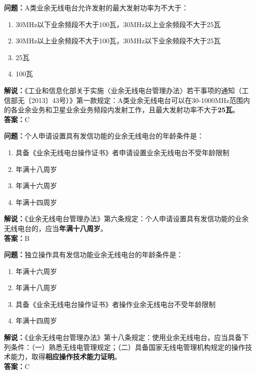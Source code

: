 \documentclass{ctexbook}
\begin{document}
\bigskip


\noindent\textbf{问题：}A类业余无线电台允许发射的最大发射功率为不大于：
\begin{enumerate}[label=\Alph*), leftmargin=3em]
	\item 30MHz以下业余频段不大于100瓦，30MHz以上业余频段不大于25瓦
	\item 30MHz以上业余频段不大于100瓦，30MHz以下业余频段不大于25瓦
	\item 25瓦
	\item 100瓦
\end{enumerate}
\noindent\textbf{解说：}《工业和信息化部关于实施〈业余无线电台管理办法〉若干事项的通知（工信部无〔2013〕43号）》第一款规定：A类业余无线电台可以在30-1000MHz范围内的各业余业务和卫星业余业务频段内发射工作，且最大发射功率不大于\textbf{25瓦}。\\\noindent\textbf{答案：}C


\bigskip


\noindent\textbf{问题：}个人申请设置具有发信功能的业余无线电台的年龄条件是：
\begin{enumerate}[label=\Alph*), leftmargin=3em]
	\item 具备《业余无线电台操作证书》者申请设置业余无线电台不受年龄限制
	\item 年满十八周岁
	\item 年满十六周岁
	\item 年满十四周岁
\end{enumerate}
\noindent\textbf{解说：}《业余无线电台管理办法》第六条规定：个人申请设置具有发信功能的业余无线电台的，应当\textbf{年满十八周岁}。\\\noindent\textbf{答案：}B


\bigskip


\noindent\textbf{问题：}独立操作具有发信功能业余无线电台的年龄条件是：
\begin{enumerate}[label=\Alph*), leftmargin=3em]
	\item 年满十六周岁
	\item 年满十八周岁
	\item 具备《业余无线电台操作证书》者操作业余无线电台不受年龄限制
	\item 年满十四周岁
\end{enumerate}
\noindent\textbf{解说：}《业余无线电台管理办法》第十八条规定：使用业余无线电台，应当具备下列条件：（一）熟悉无线电管理规定；（二）具备国家无线电管理机构规定的操作技术能力，取得\textbf{相应操作技术能力证明}。\\\noindent\textbf{答案：}C
\end{document}
